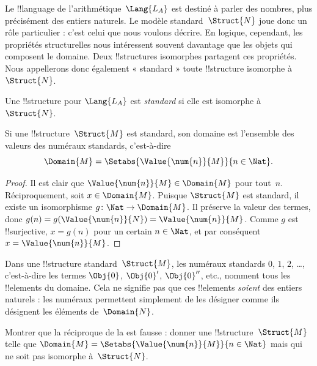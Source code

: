\documentclass[../../../include/open-logic-section]{subfiles}
\begin{document}

Le !!{language} de l'arithmétique~$\Lang{L_A}$ est destiné
à parler des nombres, plus précisément des entiers naturels.
Le modèle standard~$\Struct{N}$ joue donc un rôle particulier :
c'est celui que nous voulons décrire. En logique, cependant,
les propriétés structurelles nous intéressent souvent davantage
que les objets qui composent le domaine. Deux !!{structure}s
isomorphes partagent ces propriétés. Nous appellerons donc
également « standard » toute !!{structure} isomorphe à~$\Struct{N}$.

\begin{defn}
Une !!{structure} pour $\Lang{L_A}$ est \emph{standard}
si elle est isomorphe à~$\Struct{N}$.
\end{defn}

\begin{prop}
Si une !!{structure}~$\Struct{M}$ est standard, son domaine
est l'ensemble des valeurs des numéraux standards, c'est-à-dire
\[
  \Domain{M}=\Setabs{\Value{\num{n}}{M}}{n\in\Nat}.
\]
\end{prop}

\begin{proof}
Il est clair que
$\Value{\num{n}}{M}\in\Domain{M}$ pour tout~$n$.
Réciproquement, soit $x\in\Domain{M}$. Puisque
$\Struct{M}$ est standard, il existe un isomorphisme
$g\colon\Nat\to\Domain{M}$. Il préserve la valeur des termes,
donc
$g(n)=g(\Value{\num{n}}{N})=\Value{\num{n}}{M}$.
Comme $g$ est !!{surjective}, $x=g(n)$ pour un certain
$n\in\Nat$, et par conséquent
$x=\Value{\num{n}}{M}$.
\end{proof}

\begin{explain}
Dans une !!{structure} standard~$\Struct{M}$, les numéraux
standards $\num{0}$, $\num{1}$, $\num{2}$, \dots,
c'est-à-dire les termes $\Obj{0}$, $\Obj{0}'$,
$\Obj{0}''$, etc., nomment tous les !!{element}s du
domaine. Cela ne signifie pas que ces !!{element}s
\emph{soient} des entiers naturels : les numéraux permettent
simplement de les désigner comme ils désignent les éléments
de~$\Domain{N}$.
\end{explain}

\begin{prob}
Montrer que la réciproque de la
 est fausse :
donner une !!{structure}~$\Struct{M}$ telle que
$\Domain{M}=
\Setabs{\Value{\num{n}}{M}}{n\in\Nat}$
mais qui ne soit pas isomorphe à~$\Struct{N}$.
\end{prob}
\end{document}

